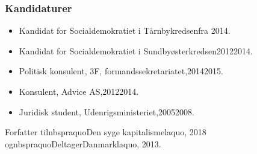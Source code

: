 \documentclass[11pt, a4paper]{awesome-cv}
\begin{document}
\begin{cvletter}
\subsubsection*{Kandidaturer}
\begin{itemize}
\item Kandidat for Socialdemokratiet i Tårnbykredsenfra 2014.
\item Kandidat for Socialdemokratiet i Sundbyøsterkredsen20122014.
\end{itemize}
\begin{itemize}
\item Politisk konsulent, 3F, formandssekretariatet,20142015.
\item Konsulent, Advice AS,20122014.
\item Juridisk student, Udenrigsministeriet,20052008.
\end{itemize}
Forfatter tilnbspraquoDen syge kapitalismelaquo, 2018 ognbspraquoDeltagerDanmarklaquo, 2013.

\end{cvletter}
\end{document}
